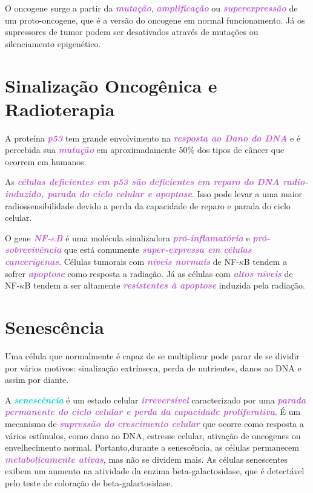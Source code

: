 \documentclass[11pt,a4paper]{article}
\begin{document}
    O oncogene surge a partir da \textcolor{MediumOrchid}{\textbf{\textit{mutação}}}, \textcolor{MediumOrchid}{\textbf{\textit{amplificação}}} ou \textcolor{MediumOrchid}{\textbf{\textit{superexpressão}}} de um proto-oncogene, que é a versão do oncogene em normal funcionamento. Já os supressores de tumor podem ser desativados através de mutações ou silenciamento epigenético.

\section{Sinalização Oncogênica e Radioterapia}

    A proteína \textcolor{MediumOrchid}{\textbf{\textit{p53}}} tem grande envolvimento na \textcolor{MediumOrchid}{\textbf{\textit{resposta ao Dano do DNA}}} e é percebida sua \textcolor{MediumOrchid}{\textbf{\textit{mutação}}} em aproximadamente 50\% dos tipos de câncer que ocorrem em humanos.

    As \textcolor{MediumOrchid}{\textbf{\textit{células deficientes em p53 são deficientes em reparo do DNA radio-induzido, parada do ciclo celular e apoptose}}}. Isso pode levar a uma maior radiossensibilidade devido a perda da capacidade de reparo e parada do ciclo celular. 

    O gene \textcolor{MediumOrchid}{\textbf{\textit{NF-$\kappa$B}}} é uma molécula sinalizadora \textcolor{MediumOrchid}{\textbf{\textit{pró-inflamatória}}} e \textcolor{MediumOrchid}{\textbf{\textit{pró-sobrevivência}}} que está comumente \textcolor{MediumOrchid}{\textbf{\textit{super-expressa em células cancerígenas}}}. Células tumorais com \textcolor{MediumOrchid}{\textbf{\textit{níveis normais}}} de NF-$\kappa$B tendem a sofrer \textcolor{MediumOrchid}{\textbf{\textit{apoptose}}} como resposta a radiação. Já as células com \textcolor{MediumOrchid}{\textbf{\textit{altos níveis}}} de NF-$\kappa$B tendem a ser altamente \textcolor{MediumOrchid}{\textbf{\textit{resistentes à apoptose}}} induzida pela radiação. 

\section{Senescência}

    Uma célula que normalmente é capaz de se multiplicar pode parar de se dividir por vários motivos: sinalização extrínseca, perda de nutrientes, danos ao DNA e assim por diante.

    A \textcolor{DarkTurquoise}{\textbf{\textit{senescência}}} é um estado celular \textcolor{MediumOrchid}{\textbf{\textit{irreversível}}} caracterizado por uma \textcolor{MediumOrchid}{\textbf{\textit{parada permanente do ciclo celular e perda da capacidade proliferativa}}}. É um mecanismo de \textcolor{MediumOrchid}{\textbf{\textit{supressão do crescimento celular}}} que ocorre como resposta a vários estímulos, como dano ao DNA, estresse celular, ativação de oncogenes ou envelhecimento normal. Portanto,durante a senescência, as células permanecem \textcolor{MediumOrchid}{\textbf{\textit{metabolicamente ativas}}}, mas não se dividem mais. As células senescentes exibem um aumento na atividade da enzima beta-galactosidase, que é detectável pelo teste de coloração de beta-galactosidase.
\end{document}
